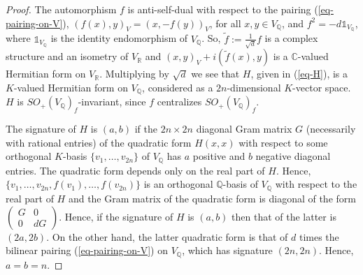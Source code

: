 \documentclass[12pt]{amsart}
\numberwithin{equation}{subsection}
\theoremstyle{plain}
\theoremstyle{definition}
\newcommand{\CC}{{\mathbb C}}
\newcommand{\QQ}{{\mathbb Q}}
\newcommand{\RR}{{\mathbb R}}
\newcommand{\Spin}{{\rm Spin}}
\newcommand{\one}{{\mathbb 1}}
\begin{document}
\begin{proof}
The automorphism $f$ is anti-self-dual with respect to the pairing (\ref{eq-pairing-on-V}), $(f(x),y)_V=(x,-f(y))_V$, for all $x, y\in V_\QQ$,  and $f^2=-d \one_{V_\QQ}$,
where $\one_{V_\QQ}$ is the identity endomorphism of $V_\QQ$.
So, $\tilde{f}:=\frac{1}{\sqrt{d}}f$ is a complex structure and an isometry of $V_\RR$ 
and $(x,y)_V+i(\tilde{f}(x),y)$ is a $\CC$-valued Hermitian form on $V_\RR$.
Multiplying by $\sqrt{d}$ we see that  $H$, given in (\ref{eq-H}), 
is a $K$-valued Hermitian form 
on $V_\QQ$, considered as a ${2n}$-dimensional $K$-vector space.
$H$ is $SO_+(V_\QQ)_f $-invariant, since $f$ centralizes $SO_+(V_\QQ)_f $. 

The signature of $H$ is $(a,b)$ if the $2n\times 2n$ diagonal Gram matrix $G$ (necessarily with 
rational entries) of the quadratic form $H(x,x)$ with respect to some orthogonal $K$-basis $\{v_1, \dots, v_{2n}\}$
of $V_\QQ$ has $a$ positive and $b$ negative diagonal entries. 
The quadratic form depends only on the real part of $H$.
Hence, $\{v_1, \dots, v_{2n},f(v_1), \dots, f(v_{2n})\}$ is an orthogonal $\QQ$-basis of $V_\QQ$ with respect to the real part of $H$ and the Gram matrix of 
the quadratic form is diagonal of the form
$\left(\begin{array}{cc}G & 0\\ 0 & dG\end{array}\right)$. 
Hence, if the signature of $H$ is $(a,b)$ then that of the latter is $(2a,2b)$.
On the other hand, the latter quadratic form is that of $d$
times the bilinear pairing (\ref{eq-pairing-on-V}) on $V_\QQ$, which has signature $(2n,2n)$. Hence, $a=b=n.$


\end{proof}
\end{document}
